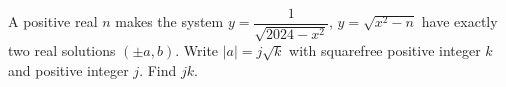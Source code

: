 A positive real $n$ makes the system $y=\dfrac{1}{\sqrt{2024-x^2}}$, $y=\sqrt{x^2-n}$ have exactly two real solutions $(\pm a,b)$. Write $|a|=j\sqrt k$ with squarefree positive integer $k$ and positive integer $j$. Find $jk$.
